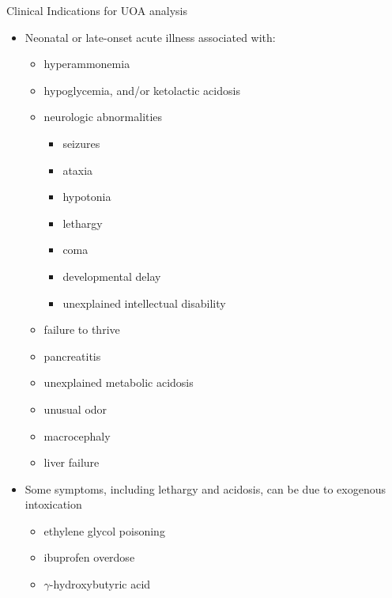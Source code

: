 \documentclass[presentation, smaller]{beamer}
\begin{document}
\begin{frame}[label={sec:orgheadline10}]{Clinical Indications for UOA analysis}
\begin{itemize}
\item Neonatal or late-onset acute illness associated with:
\begin{itemize}
\item hyperammonemia
\item hypoglycemia, and/or ketolactic acidosis
\item neurologic abnormalities
\begin{itemize}
\item seizures
\item ataxia
\item hypotonia
\item lethargy
\item coma
\item developmental delay
\item unexplained intellectual disability
\end{itemize}
\item failure to thrive
\item pancreatitis
\item unexplained metabolic acidosis
\item unusual odor
\item macrocephaly
\item liver failure
\end{itemize}
\item Some symptoms, including lethargy and acidosis, can be due to exogenous intoxication
\begin{itemize}
\item ethylene glycol poisoning
\item ibuprofen overdose
\item \(\gamma\)-hydroxybutyric acid
\end{itemize}
\end{itemize}
\end{frame}
\end{document}
